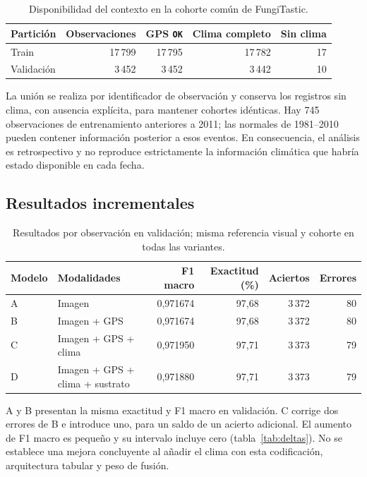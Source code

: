 \documentclass[11pt,a4paper]{article}
\begin{document}
\begin{table}[H]
\centering
\caption{Disponibilidad del contexto en la cohorte común de FungiTastic.}
\label{tab:coverage}
\begin{tabular}{lrrrr}
\toprule
Partición & Observaciones & GPS \texttt{OK} & Clima completo & Sin clima \\
\midrule
Train & 17\,799 & 17\,795 & 17\,782 & 17 \\
Validación & 3\,452 & 3\,452 & 3\,442 & 10 \\
\bottomrule
\end{tabular}
\end{table}

La unión se realiza por identificador de observación y conserva los registros
sin clima, con ausencia explícita, para mantener cohortes idénticas. Hay 745
observaciones de entrenamiento anteriores a 2011; las normales de 1981--2010
pueden contener información posterior a esos eventos. En consecuencia, el
análisis es retrospectivo y no reproduce estrictamente la información
climática que habría estado disponible en cada fecha.

\subsection{Resultados incrementales}
\begin{table}[H]
\centering
\caption{Resultados por observación en validación; misma referencia visual y cohorte en todas las variantes.}
\label{tab:validation}
\begin{tabularx}{\linewidth}{lYrrrr}
\toprule
Modelo & Modalidades & F1 macro & Exactitud (\%) & Aciertos & Errores \\
\midrule
A & Imagen & 0,971674 & 97,68 & 3\,372 & 80 \\
B & Imagen + GPS & 0,971674 & 97,68 & 3\,372 & 80 \\
C & Imagen + GPS + clima & 0,971950 & 97,71 & 3\,373 & 79 \\
D & Imagen + GPS + clima + sustrato & 0,971880 & 97,71 & 3\,373 & 79 \\
\bottomrule
\end{tabularx}
\end{table}

A y B presentan la misma exactitud y F1 macro en validación. C corrige dos
errores de B e introduce uno, para un saldo de un acierto adicional. El aumento
de F1 macro es pequeño y su intervalo incluye cero
(tabla~\ref{tab:deltas}). No se establece una mejora concluyente al añadir el
clima con esta codificación, arquitectura tabular y peso de fusión.
\end{document}
